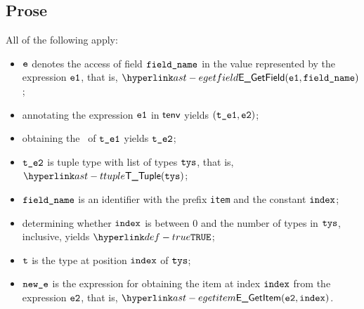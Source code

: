 \subsection{Prose}
All of the following apply:
\begin{itemize}
  \item $\texttt{e}$ denotes the access of field $\texttt{field\_name}$ in the value represented by the expression $\texttt{e1}$, that is, $\EGetField(\veone, \fieldname)$;
  \item annotating the expression $\texttt{e1}$ in $\textsf{tenv}$ yields $(\texttt{t\_e1}, \texttt{e2})$\ProseOrTypeError;
  \item obtaining the \underlyingtype\ of $\texttt{t\_e1}$ yields $\texttt{t\_e2}$\ProseOrTypeError;
  \item $\texttt{t\_e2}$ is tuple type with list of types $\texttt{tys}$, that is, $\TTuple(\tys)$;
  \item $\texttt{field\_name}$ is an identifier with the prefix \texttt{item} and the constant $\texttt{index}$;
  \item determining whether $\texttt{index}$ is between $0$ and the number of types in $\texttt{tys}$, inclusive, yields $\True$\ProseOrTypeError;
  \item $\texttt{t}$ is the type at position $\texttt{index}$ of $\texttt{tys}$;
  \item $\texttt{new\_e}$ is the expression for obtaining the item at index $\texttt{index}$ from the expression $\texttt{e2}$, that is, $\EGetItem(\vetwo, \vindex)$.
\end{itemize}



